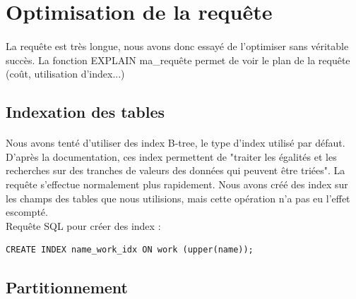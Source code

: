 \documentclass{report}
\begin{document}
	\section*{Optimisation de la requête}
	\paragraph{}{
		La requête est très longue, nous avons donc essayé de l'optimiser sans véritable succès. La fonction EXPLAIN ma\_requête permet de voir le plan de la requête (coût, utilisation d'index...)
	}
	
	\subsection*{Indexation des tables}
	\paragraph{}{
		Nous avons tenté d'utiliser des index B-tree, le type d'index utilisé par défaut. D'après la documentation, ces index permettent de "traiter les égalités et les recherches sur des tranches de valeurs des données qui peuvent être triées". La requête s'effectue normalement plus rapidement.
		Nous avons créé des index sur les champs des tables que nous utilisions, mais cette opération n'a pas eu l'effet escompté.\\
		
		Requête SQL pour créer des index : 
		
\begin{lstlisting}
CREATE INDEX name_work_idx ON work (upper(name));
\end{lstlisting}
		
	}
	
	\subsection*{Partitionnement}
\end{document}
